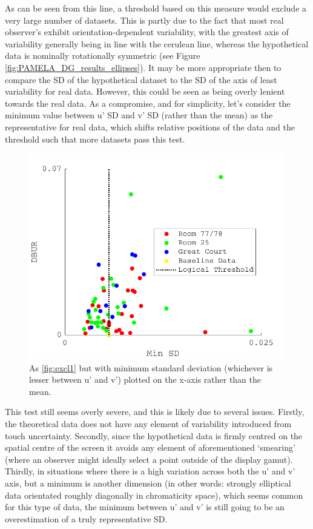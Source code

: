 As can be seen from this line, a threshold based on this measure would exclude a very large number of datasets. This is partly due to the fact that most real observer's exhibit orientation-dependent variability, with the greatest axis of variability generally being in line with the cerulean line, whereas the hypothetical data is nominally rotationally symmetric (see Figure \ref{fig:PAMELA_DG_results_ellipses}). It may be more appropriate then to compare the SD of the hypothetical dataset to the SD of the axis of least variability for real data. However, this could be seen as being overly lenient towards the real data. As a compromise, and for simplicity, let's consider the minimum value between u' SD and v' SD (rather than the mean) as the representative for real data, which shifts relative positions of the data and the threshold such that more datasets pass this test. 

\begin{figure}[hbtp] %
\includegraphics[max width=\textwidth]{figs/tablet/excl2.pdf} 
\caption{As \ref{fig:excl1} but with minimum standard deviation (whichever is lesser between u' and v') plotted on the x-axis rather than the mean.}
\label{fig:excl2}
\end{figure}

This test still seems overly severe, and this is likely due to several issues. Firstly, the theoretical data does not have any element of variability introduced from touch uncertainty. Secondly, since the hypothetical data is firmly centred on the spatial centre of the screen it avoids any element of aforementioned ‘smearing’ (where an observer might ideally select a point outside of the display gamut). Thirdly, in situations where there is a high variation across both the u’ and v’ axis, but a minimum is another dimension (in other words: strongly elliptical data orientated roughly diagonally in chromaticity space), which seems common for this type of data, the minimum between u’ and v’ is still going to be an overestimation of a truly representative SD.


